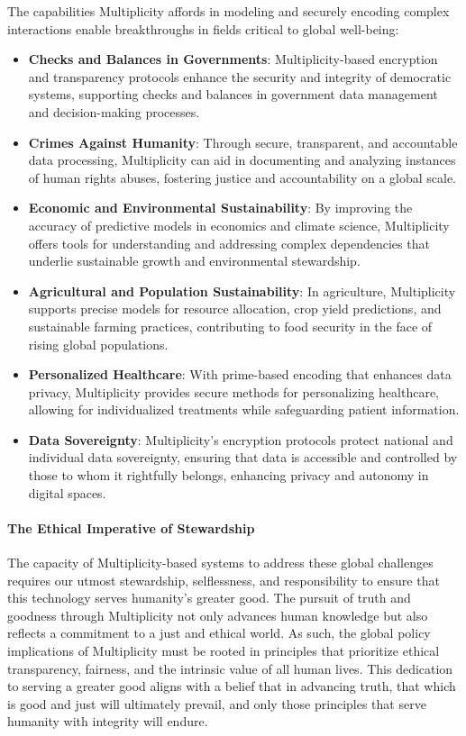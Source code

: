 \documentclass{article}
\theoremstyle{plain}
\begin{document}
\begin{enumerate}
The capabilities Multiplicity affords in modeling and securely encoding complex interactions enable breakthroughs in fields critical to global well-being:
\begin{itemize}
    \item \textbf{Checks and Balances in Governments}: Multiplicity-based encryption and transparency protocols enhance the security and integrity of democratic systems, supporting checks and balances in government data management and decision-making processes.
    \item \textbf{Crimes Against Humanity}: Through secure, transparent, and accountable data processing, Multiplicity can aid in documenting and analyzing instances of human rights abuses, fostering justice and accountability on a global scale.
    \item \textbf{Economic and Environmental Sustainability}: By improving the accuracy of predictive models in economics and climate science, Multiplicity offers tools for understanding and addressing complex dependencies that underlie sustainable growth and environmental stewardship.
    \item \textbf{Agricultural and Population Sustainability}: In agriculture, Multiplicity supports precise models for resource allocation, crop yield predictions, and sustainable farming practices, contributing to food security in the face of rising global populations.
    \item \textbf{Personalized Healthcare}: With prime-based encoding that enhances data privacy, Multiplicity provides secure methods for personalizing healthcare, allowing for individualized treatments while safeguarding patient information.
    \item \textbf{Data Sovereignty}: Multiplicity’s encryption protocols protect national and individual data sovereignty, ensuring that data is accessible and controlled by those to whom it rightfully belongs, enhancing privacy and autonomy in digital spaces.
\end{itemize}

\paragraph{The Ethical Imperative of Stewardship}

The capacity of Multiplicity-based systems to address these global challenges requires our utmost stewardship, selflessness, and responsibility to ensure that this technology serves humanity’s greater good. The pursuit of truth and goodness through Multiplicity not only advances human knowledge but also reflects a commitment to a just and ethical world. As such, the global policy implications of Multiplicity must be rooted in principles that prioritize ethical transparency, fairness, and the intrinsic value of all human lives. This dedication to serving a greater good aligns with a belief that in advancing truth, that which is good and just will ultimately prevail, and only those principles that serve humanity with integrity will endure.


\end{enumerate}
\end{document}

